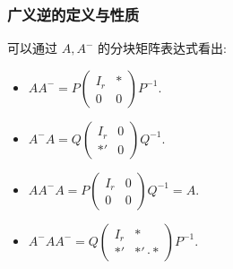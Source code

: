 \begin{frame}
\frametitle{广义逆的定义与性质}

可以通过 $A, A^-$ 的分块矩阵表达式看出:
\begin{itemize}
\item $AA^- = P \begin{pmatrix} I_r & * \\ 0 & 0 \end{pmatrix} P^{-1}.$
\item $A^-A = Q \begin{pmatrix} I_r & 0 \\ *' & 0 \end{pmatrix} Q^{-1}.$
\item $AA^-A = P \begin{pmatrix} I_r & 0 \\ 0 & 0 \end{pmatrix} Q^{-1} = A.$
\item $A^-AA^- = Q \begin{pmatrix} I_r & * \\ *' & *' \cdot * \end{pmatrix} P^{-1}.$
\end{itemize}

\end{frame}


